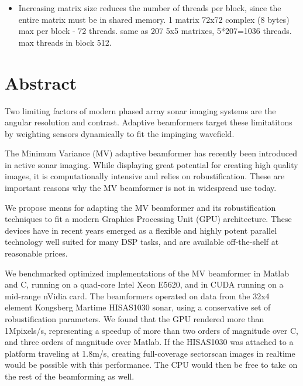 \documentclass[12pt,journal,captionsoff,onecolumn]{IEEEtran}
\newcommand\1{\vec 1}
\begin{document}
\IEEEpeerreviewmaketitle



\begin{itemize}
\item Increasing matrix size reduces the number of threads per block, since the entire matrix must be in shared memory. 1 matrix 72x72 complex (8 bytes) max per block - 72 threads. same as 207 5x5 matrixes, 5*207=1036 threads. max threads in block 512.
\end{itemize}




\section*{Abstract}

Two limiting factors of modern phased array sonar imaging systems are the angular resolution and contrast. Adaptive beamformers target these limitatitons by weighting sensors dynamically to fit the impinging wavefield.

The Minimum Variance (MV) adaptive beamformer has recently been introduced in active sonar imaging. While displaying great potential for creating high quality images, it is computationally intensive and relies on robustification. These are important reasons why the MV beamformer is not in widespread use today.

We propose means for adapting the MV beamformer and its robustification techniques to fit a modern Graphics Processing Unit (GPU) architecture. These devices have in recent years
emerged as a flexible and highly potent parallel technology well suited for many DSP tasks, and are available off-the-shelf at reasonable prices.

We benchmarked optimized implementations of the MV beamformer in Matlab and C, running on a quad-core Intel Xeon E5620, and in CUDA running on a mid-range nVidia card. The beamformers operated on data from the 32x4 element Kongsberg Martime HISAS1030 sonar, using a conservative set of robustification parameters. We found that the GPU rendered more than 1Mpixels/s, representing a speedup of more than two orders of magnitude over C, and three orders of magnitude over Matlab. If the HISAS1030 was attached to a platform traveling at 1.8m/s, creating full-coverage sectorscan images in realtime would be possible with this performance. The CPU would then be free to take on the rest of the beamforming as well.
\end{document}
